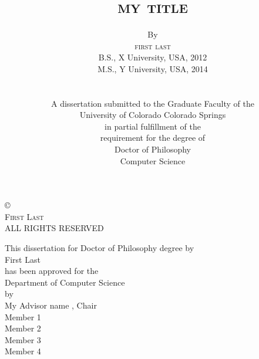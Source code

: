 \documentclass[12pt]{style/Diss_style} %
\newcommand\textlcsc[1]{\textsc{\MakeLowercase{#1}}}
\newcommand{\myfirstname}{First  }
\newcommand{\mylastname}{Last }
\newcommand{\myadvisor}{My Advisor name }
\newcommand{\mytitle}{My Title}
\begin{document}
\title{\bf \textlcsc{{\LARGE \mytitle}}}
\author{By \\
\textlcsc{\large \myfirstname \mylastname} \\
B.S., X University, USA, 2012\\
M.S., Y University, USA, 2014\\
\\ 
\\ 
A dissertation submitted to the Graduate Faculty of the\\
University of Colorado Colorado Springs\\
in partial fulfillment of the\\
requirement for the degree of\\
Doctor of Philosophy \\
Computer Science\\
\the\year}
\maketitle
\thispagestyle{empty}
\begin{center}

	\vspace*{\fill}
	\copyright  \the\year \\ \textsc{\myfirstname \mylastname} \\
	ALL RIGHTS RESERVED\rm
	\end{center}
%
\begin{minipage}{5.0in}

\end{minipage}
\newpage


\begin{center}
	This dissertation for Doctor of Philosophy degree by\\
	\myfirstname \mylastname\\
	has been approved for the \\
 	Department of Computer Science \\
	by \\ %
	\vspace{3.0pc}
	\myadvisor, Chair \\
	\vspace{2.0pc}
    Member 1 \\
	\vspace{2.0pc}
	Member 2 \\
	\vspace{2.0pc}
	Member 3 \\
	\vspace{2.0pc}
	Member 4 \\
\end{center}
\end{document}
